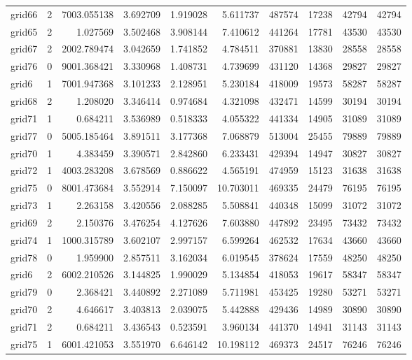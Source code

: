\documentclass[../../../thesis.tex]{subfiles}
\begin{document}
\begin{longtable}{|l|r|r|r|r|r|r|r|r|r|}
grid66 & 2 & 7003.055138 & 3.692709 & 1.919028 & 5.611737 & 487574 & 17238 & 42794 & 42794 \\
grid65 & 2 & 1.027569 & 3.502468 & 3.908144 & 7.410612 & 441264 & 17781 & 43530 & 43530 \\
grid67 & 2 & 2002.789474 & 3.042659 & 1.741852 & 4.784511 & 370881 & 13830 & 28558 & 28558 \\
grid76 & 0 & 9001.368421 & 3.330968 & 1.408731 & 4.739699 & 431120 & 14368 & 29827 & 29827 \\
grid6 & 1 & 7001.947368 & 3.101233 & 2.128951 & 5.230184 & 418009 & 19573 & 58287 & 58287 \\
grid68 & 2 & 1.208020 & 3.346414 & 0.974684 & 4.321098 & 432471 & 14599 & 30194 & 30194 \\
grid71 & 1 & 0.684211 & 3.536989 & 0.518333 & 4.055322 & 441334 & 14905 & 31089 & 31089 \\
grid77 & 0 & 5005.185464 & 3.891511 & 3.177368 & 7.068879 & 513004 & 25455 & 79889 & 79889 \\
grid70 & 1 & 4.383459 & 3.390571 & 2.842860 & 6.233431 & 429394 & 14947 & 30827 & 30827 \\
grid72 & 1 & 4003.283208 & 3.678569 & 0.886622 & 4.565191 & 474959 & 15123 & 31638 & 31638 \\
grid75 & 0 & 8001.473684 & 3.552914 & 7.150097 & 10.703011 & 469335 & 24479 & 76195 & 76195 \\
grid73 & 1 & 2.263158 & 3.420556 & 2.088285 & 5.508841 & 440348 & 15099 & 31072 & 31072 \\
grid69 & 2 & 2.150376 & 3.476254 & 4.127626 & 7.603880 & 447892 & 23495 & 73432 & 73432 \\
grid74 & 1 & 1000.315789 & 3.602107 & 2.997157 & 6.599264 & 462532 & 17634 & 43660 & 43660 \\
grid78 & 0 & 1.959900 & 2.857511 & 3.162034 & 6.019545 & 378624 & 17559 & 48250 & 48250 \\
grid6 & 2 & 6002.210526 & 3.144825 & 1.990029 & 5.134854 & 418053 & 19617 & 58347 & 58347 \\
grid79 & 0 & 2.368421 & 3.440892 & 2.271089 & 5.711981 & 453425 & 19280 & 53271 & 53271 \\
grid70 & 2 & 4.646617 & 3.403813 & 2.039075 & 5.442888 & 429436 & 14989 & 30890 & 30890 \\
grid71 & 2 & 0.684211 & 3.436543 & 0.523591 & 3.960134 & 441370 & 14941 & 31143 & 31143 \\
grid75 & 1 & 6001.421053 & 3.551970 & 6.646142 & 10.198112 & 469373 & 24517 & 76246 & 76246 \\

\end{longtable}
\end{document}
